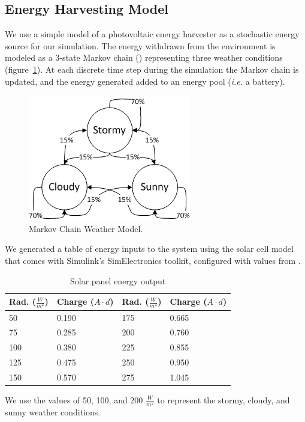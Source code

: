 \subsection{Energy Harvesting Model}
We use a simple model of a photovoltaic energy harvester as a stochastic energy source for our simulation.  The energy withdrawn from the environment is modeled as a 3-state Markov chain (\cite{poggi2000stochastic,moser2007real}) representing three weather conditions (figure~\ref{fig:markov}).  At each discrete time step during the simulation the Markov chain is updated, and the energy generated added to an energy pool (\emph{i.e.} a battery).
\begin{figure}[htb]
\label{fig:markov}
\caption{Markov Chain Weather Model.}
\includegraphics{markov.png}
\end{figure}
We generated a table of energy inputs to the system using the solar cell model that comes with Simulink's SimElectronics toolkit, configured with values from \cite{gonzalez2006model}.  

\begin{table}[h]
\begin{center}
\begin{tabular}{| l | l || l | l |}
\hline
\textbf{Rad. ($\frac{W}{m^2}$)} & \textbf{Charge ($A\cdot d$)} & \textbf{Rad. ($\frac{W}{m^2}$)} & \textbf{Charge ($A\cdot d$)} \\
\hline
50 & 0.190 & 175 & 0.665 \\
75 & 0.285 & 200 & 0.760 \\
100 & 0.380 & 225 & 0.855 \\
125 & 0.475 & 250 & 0.950 \\
150 & 0.570 & 275 & 1.045 \\
\hline
\end{tabular}
\end{center}
\label{tab:radiance}
\caption{Solar panel energy output}
\end{table}

We use the values of 50, 100, and 200 $\frac{W}{m^2}$ to represent the stormy, cloudy, and sunny weather conditions.

